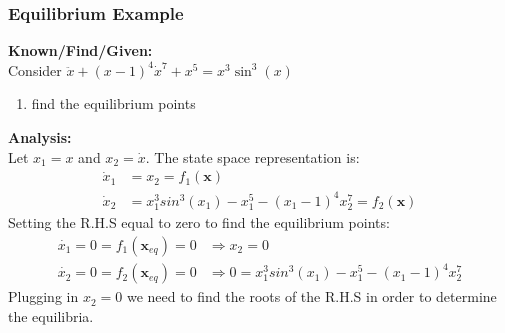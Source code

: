 \documentclass[11pt,handout]{beamer}   %
\begin{document}
\begin{frame}
\frametitle{Equilibrium Example}
\small
\textbf{Known/Find/Given:}\\
Consider $\ddot{x} + (x-1)^4 \dot{x}^7 + x^5 = x^3\sin ^3(x)$
\begin{enumerate}
\item find the equilibrium points
\end{enumerate}
\textbf{Analysis:}\\
Let $x_1 = x$ and $x_2 = \dot{x}$. The state space representation is:
\begin{equation*}
\begin{aligned}
\dot{x}_1 &= x_2 = f_1(\mathbf{x})\\
\dot{x}_2 &= x_1^3sin^3(x_1) - x_1^5 - (x_1-1)^4x_2^7 = f_2(\mathbf{x})
\end{aligned}
\end{equation*}
Setting the R.H.S equal to zero to find the equilibrium points:
\begin{equation*}
\begin{aligned}
\dot{x_1} = 0 = f_1(\mathbf{x}_{eq}) = 0 &\Rightarrow x_{2} = 0\\
\dot{x_2} = 0 = f_2(\mathbf{x}_{eq}) = 0 &\Rightarrow 0 = x_1^3sin^3(x_1) - x_1^5 - (x_1-1)^4x_2^7
\end{aligned}
\end{equation*}
Plugging in $x_2 = 0$ we need to find the roots of the R.H.S in order to determine the equilibria.
\end{frame}
\end{document}
